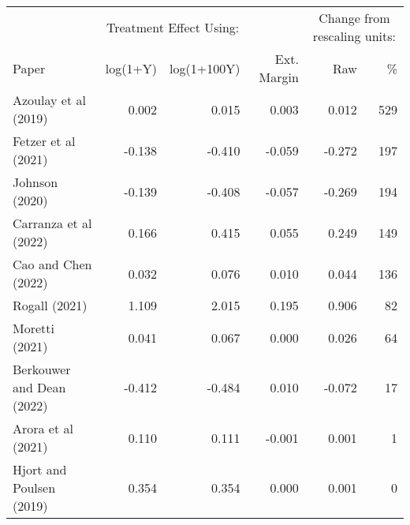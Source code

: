 \begin{tabular}{lrrrrr}
\toprule
 & \multicolumn{2}{c}{Treatment Effect Using:} &  & \multicolumn{2}{c}{Change from rescaling units:} \\ 
\cmidrule(lr){2-3} \cmidrule(lr){5-6}
Paper & log(1+Y) & log(1+100Y) & Ext. Margin & Raw & \% \\ 
\midrule\addlinespace[2.5pt]
Azoulay et al (2019) & 0.002 & 0.015 & 0.003 & 0.012 & 529 \\ 
Fetzer et al (2021) & -0.138 & -0.410 & -0.059 & -0.272 & 197 \\ 
Johnson (2020) & -0.139 & -0.408 & -0.057 & -0.269 & 194 \\ 
Carranza et al (2022) & 0.166 & 0.415 & 0.055 & 0.249 & 149 \\ 
Cao and Chen (2022) & 0.032 & 0.076 & 0.010 & 0.044 & 136 \\ 
Rogall (2021) & 1.109 & 2.015 & 0.195 & 0.906 & 82 \\ 
Moretti (2021) & 0.041 & 0.067 & 0.000 & 0.026 & 64 \\ 
Berkouwer and Dean (2022) & -0.412 & -0.484 & 0.010 & -0.072 & 17 \\ 
Arora et al (2021) & 0.110 & 0.111 & -0.001 & 0.001 & 1 \\ 
Hjort and Poulsen (2019) & 0.354 & 0.354 & 0.000 & 0.001 & 0 \\ 
\bottomrule
\end{tabular}
